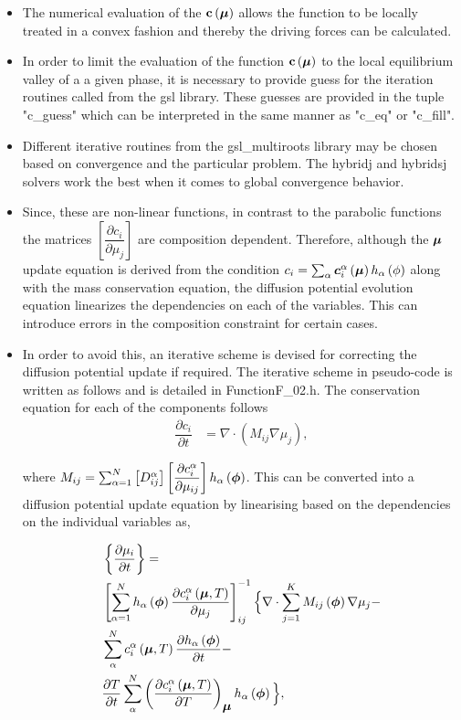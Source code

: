 \documentclass[a4paper,10pt]{article}
\newcommand{\vphi}{\mbox{\boldmath{$\phi$}}}
\newcommand{\vc}{\mbox{\boldmath{$c$}}}
\newcommand{\vmu}{\mbox{\boldmath{$\mu$}}}
\begin{document}
\begin{itemize}
 \item The numerical evaluation of the $\mathbf{c}\left(\mathbf{\vmu}\right)$ allows the function to be locally treated in a convex fashion and thereby the 
 driving forces can be calculated. 
 \item In order to limit the evaluation of the function $\mathbf{c}\left(\mathbf{\vmu}\right)$ to the local equilibrium valley of a a given phase, it is necessary 
 to provide guess for the iteration routines called from the gsl library. These guesses are provided in the tuple "c\_guess" which can be interpreted in the same 
 manner as "c\_eq" or "c\_fill".
 \item Different iterative routines from the gsl\_multiroots library may be chosen based on convergence and the particular problem. The hybridj and hybridsj solvers 
 work the best when it comes to global convergence behavior.
 \item Since, these are non-linear functions, in contrast to the parabolic functions the matrices $\left[\dfrac{\partial c_i}{\partial \mu_j}\right]$ are composition dependent. 
 Therefore, although the $\vmu$ update equation is derived from the condition $c_i = \sum_\alpha \vc_i^{\alpha}\left(\mathbf{\vmu}\right)h_\alpha\left(\mathbf{\phi}\right)$ along with 
 the mass conservation equation, the diffusion potential evolution equation linearizes the dependencies on each of the variables. This can introduce errors in the composition constraint for certain cases. 
 \item In order to avoid this, an iterative scheme is devised for correcting the diffusion potential update if required. The iterative scheme in pseudo-code 
 is written as follows and is detailed  in FunctionF\_02.h. The conservation equation for each of the components follows
 \begin{align}
  \dfrac{\partial c_i}{\partial t} &= \nabla \cdot \left(M_{ij}\nabla\mu_j\right),
  \label{Mass_conservation}
 \end{align}
 
 where $M_{ij}=\sum_{\alpha=1}^{N}\left[D_{ij}^{\alpha}\right]\left[\dfrac{\partial c_i^{\alpha}}{\partial \mu_{ij}}\right]h_\alpha\left(\vphi\right)$. 
 This can be converted into a diffusion potential update equation by
 linearising based on the dependencies on the individual variables as,
 
 \begin{align}
 &\left\lbrace\dfrac{\partial \mu_i}{\partial t}\right\rbrace = \nonumber\\
&\left[\sum_{\alpha=1}^N 
h_\alpha\left(\vphi\right)\dfrac{\partial c_i^\alpha\left(\vmu,
T\right)}{\partial\mu_j}\right]^{-1}_{ij}\Big\lbrace\nabla\cdot\sum_{j=1}^{K}M_{ij}
\left(\vphi\right)\nabla\mu_j 
- \nonumber\\
&\sum_{\alpha}^N c^\alpha_{i}\left(\vmu,T\right)\dfrac{\partial
h_\alpha\left(\vphi\right)}{\partial t} - \nonumber \\
&\dfrac{\partial T}{\partial t}\sum_{\alpha}^N \left(\dfrac{\partial c^\alpha_{i}\left(\vmu,T\right)}{\partial T}\right)_{\vmu}
h_\alpha\left(\vphi\right)\Big\rbrace,
\label{Mu_explicit_temperature}
\end{align}


\end{itemize}
\end{document}
